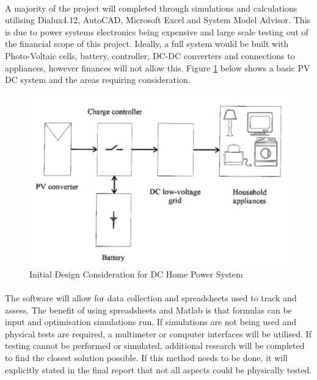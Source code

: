 \paragraph{}
A majority of the project will completed through simulations and calculations utilising Dialux4.12, AutoCAD, Microsoft Excel and System Model Advisor. This is due to power systems electronics being expensive and large scale testing out of the financial scope of this project. Ideally, a full system would be built with Photo-Voltaic cells, battery, controller, DC-DC converters and connections to appliances, however finances will not allow this. Figure \ref{fig:DCHomeSystem} below shows a basic PV DC system and the areas requiring consideration. 

\begin{figure}[H]
\hfill\includegraphics[width = 120mm]{images/DC_Home}\hspace*{\fill}
\caption{Initial Design Consideration for DC Home Power System \cite{Pellis1997}} 
\label{fig:DCHomeSystem}
\end{figure} 

\paragraph{} 
The software will allow for data collection and spreadsheets used to track and assess. The benefit of using spreadsheets and Matlab is that formulas can be input and optimisation simulations run. If simulations are not being used and physical tests are required, a multimeter or computer interfaces will be utilised. If testing cannot be performed or simulated, additional research will be completed to find the closest solution possible. If this method needs to be done, it will explicitly stated in the final report that not all aspects could be physically tested.     

